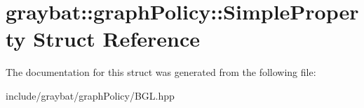 \hypertarget{structgraybat_1_1graphPolicy_1_1SimpleProperty}{}\section{graybat\+:\+:graph\+Policy\+:\+:Simple\+Property Struct Reference}
\label{structgraybat_1_1graphPolicy_1_1SimpleProperty}


The documentation for this struct was generated from the following file\+:\begin{DoxyCompactItemize}
\item 
include/graybat/graph\+Policy/B\+G\+L.\+hpp\end{DoxyCompactItemize}
